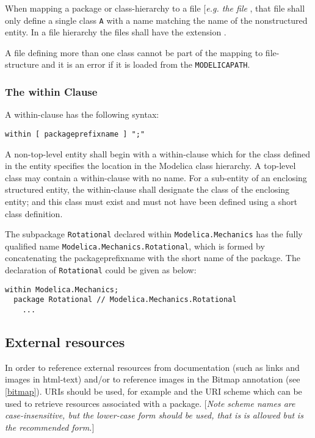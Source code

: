 When mapping a package or class-hierarchy to a file {[}\emph{e.g. the
  file} \filename{A.mo}{]}, that file shall only define a single class \lstinline!A! with a
name matching the name of the nonstructured entity. In a file hierarchy
the files shall have the extension .

A  file defining more than one class cannot be part of the mapping
to file-structure and it is an error if it is loaded from the
\lstinline!MODELICAPATH!.

\subsubsection{The within Clause}

A within-clause has the following syntax:

\begin{lstlisting}[language=grammar]
  within [ packageprefixname ] ";"
\end{lstlisting}
  A non-top-level entity shall begin with a within-clause which for the
  class defined in the entity specifies the location in the Modelica class
    hierarchy. A top-level class may contain a within-clause with no name.
    For a sub-entity of an enclosing structured entity, the within-clause
shall designate the class of the enclosing entity; and this class must
exist and must not have been defined using a short class definition.

\begin{example}
The subpackage \lstinline!Rotational! declared within
\lstinline!Modelica.Mechanics! has the fully qualified name
\lstinline!Modelica.Mechanics.Rotational!, which is formed by concatenating
the packageprefixname with the short name of the package. The
declaration of \lstinline!Rotational! could be given as below:
\begin{lstlisting}[language=modelica]
  within Modelica.Mechanics;
  package Rotational // Modelica.Mechanics.Rotational
    ...
\end{lstlisting}
\end{example}

\subsection{External resources}

In order to reference external resources from documentation (such as
links and images in html-text) and/or to reference images in the Bitmap
annotation (see \autoref{bitmap}). URIs should be used, for example
 and the URI scheme  which can be used to retrieve
resources associated with a package. {[}\emph{Note scheme names are
case-insensitive, but the lower-case form should be used, that is}  \emph{is allowed but}  \emph{is the
recommended form.}{]}

